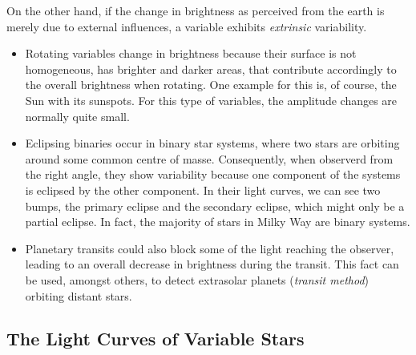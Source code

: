 On the other hand, if the change in brightness as perceived from the earth is merely due to external influences, a variable exhibits \emph{extrinsic} variability.

\begin{itemize}
\item Rotating variables change in brightness because their surface is not homogeneous, \eg has brighter and darker areas, that contribute accordingly to the overall brightness when rotating. One example for this is, of course, the Sun with its sunspots. For this type of variables, the amplitude changes are normally quite small.
\item Eclipsing binaries occur in binary star systems, where two stars are orbiting around some common centre of masse. Consequently, when observerd from the right angle, they show variability because one component of the systems is eclipsed by the other component. In their light curves, we can see two bumps, the primary eclipse and the secondary eclipse, which might only be a partial eclipse. In fact, the majority of stars in Milky Way are binary systems.
\item Planetary transits could also block some of the light reaching the observer, leading to an overall decrease in brightness during the transit. This fact can be used, amongst others, to detect extrasolar planets (\emph{transit method}) orbiting distant stars.
\end{itemize}
 

\subsection{The Light Curves of Variable Stars}
\label{subsec:light-curves-variables}

